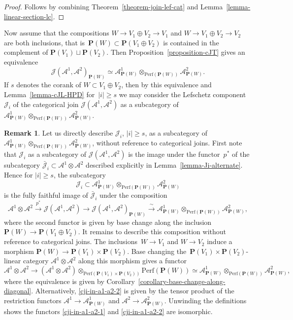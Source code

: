 \documentclass[11pt, reqno]{amsart}
\numberwithin{equation}{section}
\theoremstyle{plain}
\theoremstyle{definition}
\newtheorem{remark}[theorem]{Remark}
\newcommand{\Perf}{\mathrm{Perf}}
\newcommand{\barcJ}{\bar{\mathcal{J}}}
\newcommand{\cA}{\mathcal{A}}
\newcommand{\cJ}{\mathcal{J}}
\newcommand{\bP}{\mathbf{P}}
\begin{document}
\begin{proof}
Follows by combining Theorem~\ref{theorem-join-lef-cat} and Lemma~\ref{lemma-linear-section-lc}. 
\end{proof}

Now assume that the compositions $W \to V_1 \oplus V_2 \to V_1$ and $W \to V_1 \oplus V_2 \to V_2$ are both inclusions,
that is~$\bP(W) \subset \bP(V_1 \oplus V_2)$ is contained in the complement of $\bP(V_1) \sqcup \bP(V_2)$.
Then Proposition~\ref{proposition-cJT} gives an equivalence
\begin{equation}
\label{eq:cj-pl-a1-a2}
\cJ(\cA^1, \cA^2)_{\bP(W)} \simeq \cA^1_{\bP(W)} \otimes_{\Perf(\bP(W))} \cA^2_{\bP(W)}. 
\end{equation} 
If $s$ denotes the corank of $W \subset V_1 \oplus V_2$, then 
by this equivalence and Lemma~\ref{lemma-cJL-HPD} for~$|i| \geq s$ we may consider 
the Lefschetz component $\cJ_i$ of the categorical join $\cJ(\cA^1, \cA^2)$ 
as a subcategory of $\cA^1_{\bP(W)} \otimes_{\Perf(\bP(W))} \cA^2_{\bP(W)}$.


\begin{remark}
\label{remark:cji-in-a1-a2}
Let us directly describe $\cJ_i$, $|i| \geq s$, as a subcategory of 
$\cA^1_{\bP(W)} \otimes_{\Perf(\bP(W))} \cA^2_{\bP(W)}$, without reference to categorical joins.
First note that $\cJ_i$ as a subcategory of $\cJ(\cA^1, \cA^2)$ is the image under the functor~$p^*$ 
of the subcategory $\barcJ_i \subset \cA^1 \otimes \cA^2$ 
described explicitly in Lemma~\ref{lemma-Ji-alternate}. 
Hence for $|i| \geq s$, the subcategory 
\begin{equation*}
\cJ_i \subset \cA^1_{\bP(W)} \otimes_{\Perf(\bP(W))} \cA^2_{\bP(W)}
\end{equation*}
is the fully faithful image of $\barcJ_i$ under the composition 
\begin{equation}
\label{cji-in-a1-a2-1}
\cA^1 \otimes \cA^2 \xrightarrow{\ p^*\ } \cJ(\cA^1, \cA^2) \to \cJ(\cA^1, \cA^2)_{\bP(W)} \xrightarrow{\ \sim\ }
\cA^1_{\bP(W)} \otimes_{\Perf(\bP(W))} \cA^2_{\bP(W)}, 
\end{equation}
where the second functor is given by base change along the inclusion $\bP(W) \to \bP(V_1 \oplus V_2)$. 
It remains to describe this composition without reference to categorical joins. 
The inclusions~$W \to V_1$ and $W \to V_2$ induce a 
morphism $\bP(W) \to \bP(V_1) \times \bP(V_2)$. 
Base changing the~$\bP(V_1) \times \bP(V_2)$-linear category $\cA^1 \otimes \cA^2$ along this morphism 
gives a functor 
\begin{equation}
\label{cji-in-a1-a2-2}
\cA^1 \otimes \cA^2 \to (\cA^1 \otimes \cA^2) \otimes_{\Perf(\bP(V_1) \times \bP(V_2))} \Perf(\bP(W)) 
\simeq \cA^1_{\bP(W)} \otimes_{\Perf(\bP(W))} \cA^2_{\bP(W)}, 
\end{equation}
where the equivalence is given by Corollary~\ref{corollary-base-change-along-diagonal}. 
Alternatively, \eqref{cji-in-a1-a2-2} is given by the tensor product of the restriction functors 
$\cA^1 \to \cA^1_{\bP(W)}$ and $\cA^2 \to \cA^2_{\bP(W)}$. 
Unwinding the definitions shows the functors \eqref{cji-in-a1-a2-1} and \eqref{cji-in-a1-a2-2} 
are isomorphic. 
\end{remark}
\end{document}
